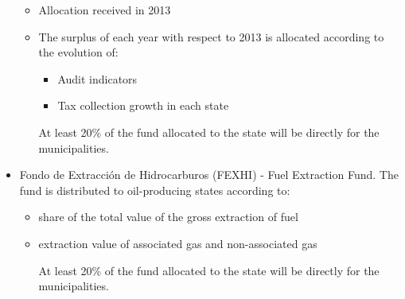 \documentclass[dv_diss_main.tex]{subfiles}
\begin{document}
\begin{itemize}
   \begin{itemize}
   \item Allocation received in 2013
   \item The surplus of each year with respect to 2013 is allocated according to the evolution of:
        \begin{itemize}
            \item Audit indicators
            \item Tax collection growth in each state
        \end{itemize}
   At least 20\% of the fund allocated to the state will be directly for the municipalities.
   \end{itemize}
   
    \item 	Fondo de Extracción de Hidrocarburos (FEXHI) - Fuel Extraction Fund. The fund is distributed to oil-producing states according to:
    
   \begin{itemize}
   \item share of the total value of the gross extraction of fuel
   \item extraction value of associated gas and non-associated gas
        
   At least 20\% of the fund allocated to the state will be directly for the municipalities.
   \end{itemize}
   
\end{itemize}
\end{document}
